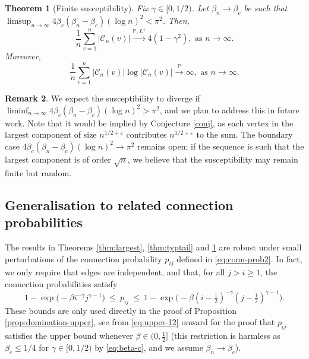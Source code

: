 \documentclass[a4paper, a4wide, 10pt, reqno]{amsart}
\theoremstyle{plain}
\newtheorem{theorem}{Theorem}[section]
\theoremstyle{definition}
\newtheorem{remark}[theorem]{Remark}
\numberwithin{equation}{section}
\newcommand{\Prob}{\mathbb{P}}
\newcommand{\sC}{{\mathscr C}}
\begin{document}
\begin{theorem}[Finite susceptibility]\label{thm:susceptibility}
	Fix $\gamma\in[0, 1/2)$. Let $\beta_n\to\beta_c$ be such that $\limsup_{n\to\infty}4\beta_c(\beta_n-\beta_c)(\log n)^2<\pi^2$. Then,
	\begin{equation}\label{eq:thm-sus}
		\frac{1}{n}\sum_{v=1}^n|\sC_{n}(v)|\overset{\Prob, L^1}\longrightarrow 4(1-\gamma^2), \text{ as } n\to\infty.
	\end{equation}
    Moreover, 
    \begin{equation}\label{eq:thm-logsus}
		\frac{1}{n}\sum_{v=1}^n|\sC_{n}(v)|\log|\sC_n(v)|\overset{\Prob}\longrightarrow \infty, \text{ as }  n\to\infty.
	\end{equation}
\end{theorem}

\begin{remark}We expect the susceptibility to diverge if $\liminf_{n\to\infty}4\beta_c(\beta_n-\beta_c)(\log n)^2>\pi^2$, and we plan to address this in future work. Note that it would be implied by Conjecture \ref{conj}, as each vertex in the largest component of size $n^{1/2+\varepsilon}$ contributes  $n^{1/2+\varepsilon}$ to the sum. The boundary case $4\beta_c(\beta_n-\beta_c)(\log n)^2\to\pi^2$ remains open; if the sequence is such that the largest component is of order $\sqrt{n}$, we believe that the susceptibility may remain finite but random.%
\end{remark}

\subsection{Generalisation to related connection probabilities}
The results in Theorems \ref{thm:largest}, \ref{thm:typtail} and \ref{thm:susceptibility} are robust under small perturbations of the connection probability $p_{ij}$ defined in \eqref{eq:conn-prob2}. In fact, we only require that edges are independent, and that, for all $j>i\ge 1$, the connection probabilities satisfy 
\begin{equation}\label{eq:conn-prob-range}
    1-\exp\big(-\beta i^{-\gamma}j^{\gamma-1}\big)\ \le \ p_{ij}\ \le\ 1-\exp\big(-\beta (i-\tfrac12)^{-\gamma}(j-\tfrac12)^{\gamma-1}\big).\end{equation}
These bounds are only used directly in the proof of Proposition \ref{prop:domination-upper}, see from \eqref{eq:upper-12} onward for the proof that $p_{ij}$ satisfies the upper bound whenever $\beta\in(0, \frac12]$ (this restriction is harmless as $\beta_c\le 1/4$ for $\gamma\in[0,1/2)$ by \eqref{eq:beta-c}, and we assume $\beta_n\to\beta_c$).
\smallskip
\end{document}
